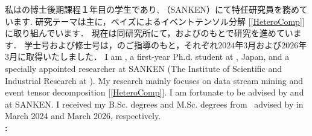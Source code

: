 \vspace{1.0em}
\ifjp
    私は\OU の博士後期課程１年目の学生であり, \SANKEN（SANKEN）にて特任研究員を務めています.
  研究テーマは主に，ベイズによるイベントテンソル分解 [\ref{HeteroComp}] に取り組んでいます．
  現在は同研究所にて，\href{\YSakuraiURL}{\Prof{\YSakurai}}および\href{\YMatsubaraURL}{\Prof{\YMatsubara}}のもとで研究を進めています．
  学士号および修士号は，\href{\YSakuraiURL}{\Prof{\YSakurai}}のご指導のもと，それぞれ$2024$年$3$月および$2026$年$3$月に取得いたしました．
\else
    I am \MyName, a first-year Ph.d.\! student at \OU, Japan, and a specially appointed researcher at SANKEN (The Institute of Scientific and Industrial Research at \OU).
    My research mainly focuses on data stream mining and event tensor decomposition [\ref{HeteroComp}].
    I am fortunate to be advised by \href{\YSakuraiURL}{\Prof{\YSakurai}} and \href{\YMatsubaraURL}{\Prof{\YMatsubara}} at SANKEN.
    I received my B.Sc.\!  degrees and M.Sc. degrees from \OU\ advised by  \href{\YSakuraiURL}{\Prof{\YSakurai}} in March 2024 and March 2026, respectively.
\fi
\vspace{0.2em}
\\
\textbf{:}
    
\vspace{0.5em}

